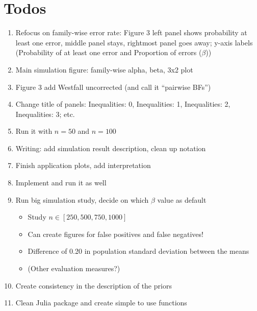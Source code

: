 \documentclass[11pt,a4paper]{article}
\theoremstyle{definition} %
\theoremstyle{case}
\begin{document}
\section*{Todos}
\begin{enumerate}
   \item Refocus on family-wise error rate: Figure 3 left panel shows probability at least one error, middle panel stays, rightmost panel goes away; y-axis labels (Probability of at least one error and Proportion of errors ($\beta$))
   \item Main simulation figure: family-wise alpha, beta, 3x2 plot
   \item Figure 3 add Westfall uncorrected (and call it ``pairwise BFs'')
   \item Change title of panels: Inequalities: 0, Inequalities: 1, Inequalities: 2, Inequalities: 3; etc.
   \item Run it with $n = 50$ and $n = 100$

   \item Writing: add simulation result description, clean up notation

   \item Finish application plots, add interpretation
   \item Implement \textcite{westfall1997bayesian} and run it as well
   \item Run big simulation study, decide on which $\beta$ value as default
   \begin{itemize}
       \item Study $n \in [250, 500, 750, 1000]$
       \item Can create figures for false positives and false negatives!
       \item Difference of 0.20 in population standard deviation between the means
       \item (Other evaluation measures?)
   \end{itemize}
   \item Create consistency in the description of the priors
   \item Clean Julia package and create simple to use functions
\end{enumerate}
\end{document}
